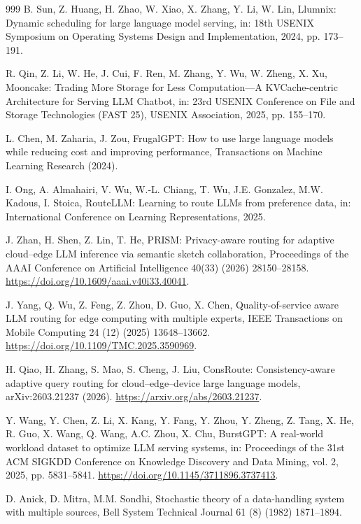 \documentclass[futureinternet,article,submit,moreauthors]{Definitions/mdpi}
\begin{document}
\begin{thebibliography}{999}
B. Sun, Z. Huang, H. Zhao, W. Xiao, X. Zhang, Y. Li, W. Lin,
Llumnix: Dynamic scheduling for large language model serving,
in: 18th USENIX Symposium on Operating Systems Design and Implementation, 2024, pp. 173--191.

R. Qin, Z. Li, W. He, J. Cui, F. Ren, M. Zhang, Y. Wu,
W. Zheng, X. Xu,
Mooncake: Trading More Storage for Less Computation---A
KVCache-centric Architecture for Serving LLM Chatbot,
in: 23rd USENIX Conference on File and Storage Technologies
(FAST 25), USENIX Association, 2025, pp. 155--170.

L. Chen, M. Zaharia, J. Zou,
FrugalGPT: How to use large language models while reducing cost and improving performance,
Transactions on Machine Learning Research (2024).

I. Ong, A. Almahairi, V. Wu, W.-L. Chiang, T. Wu, J.E. Gonzalez, M.W. Kadous, I. Stoica,
RouteLLM: Learning to route LLMs from preference data,
in: International Conference on Learning Representations, 2025.

J. Zhan, H. Shen, Z. Lin, T. He,
PRISM: Privacy-aware routing for adaptive cloud--edge LLM inference via semantic sketch collaboration,
Proceedings of the AAAI Conference on Artificial Intelligence 40(33) (2026) 28150--28158.
\newblock \url{https://doi.org/10.1609/aaai.v40i33.40041}.

J. Yang, Q. Wu, Z. Feng, Z. Zhou, D. Guo, X. Chen,
Quality-of-service aware LLM routing for edge computing with multiple experts,
IEEE Transactions on Mobile Computing 24 (12) (2025) 13648--13662.
\newblock \url{https://doi.org/10.1109/TMC.2025.3590969}.

H. Qiao, H. Zhang, S. Mao, S. Cheng, J. Liu,
ConsRoute: Consistency-aware adaptive query routing for cloud--edge--device large language models,
arXiv:2603.21237 (2026).
\newblock \url{https://arxiv.org/abs/2603.21237}.

Y. Wang, Y. Chen, Z. Li, X. Kang, Y. Fang, Y. Zhou, Y. Zheng, Z. Tang,
X. He, R. Guo, X. Wang, Q. Wang, A.C. Zhou, X. Chu,
BurstGPT: A real-world workload dataset to optimize LLM serving systems,
in: Proceedings of the 31st ACM SIGKDD Conference on Knowledge Discovery and Data Mining, vol. 2, 2025, pp. 5831--5841.
\newblock \url{https://doi.org/10.1145/3711896.3737413}.

D. Anick, D. Mitra, M.M. Sondhi,
Stochastic theory of a data-handling system with multiple sources,
Bell System Technical Journal 61 (8) (1982) 1871--1894.


\end{thebibliography}
\end{document}

